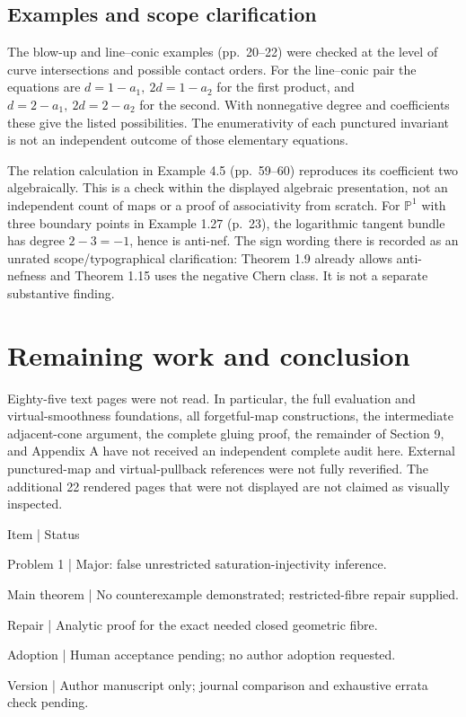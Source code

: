 \documentclass[10pt]{article}
\begin{document}
\subsection*{Examples and scope clarification}
The blow-up and line–conic examples (pp. 20–22) were checked at the level of curve intersections and possible contact orders. For the line–conic pair the equations are \(d=1-a_1,\ 2d=1-a_2\) for the first product, and \(d=2-a_1,\ 2d=2-a_2\) for the second. With nonnegative degree and coefficients these give the listed possibilities. The enumerativity of each punctured invariant is not an independent outcome of those elementary equations.\par
The relation calculation in Example 4.5 (pp. 59–60) reproduces its coefficient two algebraically. This is a check within the displayed algebraic presentation, not an independent count of maps or a proof of associativity from scratch. For \(\mathbb P^1\) with three boundary points in Example 1.27 (p. 23), the logarithmic tangent bundle has degree \(2-3=-1\), hence is anti-nef. The sign wording there is recorded as an unrated scope/typographical clarification: Theorem 1.9 already allows anti-nefness and Theorem 1.15 uses the negative Chern class. It is not a separate substantive finding.\par
\section*{Remaining work and conclusion}
Eighty-five text pages were not read. In particular, the full evaluation and virtual-smoothness foundations, all forgetful-map constructions, the intermediate adjacent-cone argument, the complete gluing proof, the remainder of Section 9, and Appendix A have not received an independent complete audit here. External punctured-map and virtual-pullback references were not fully reverified. The additional 22 rendered pages that were not displayed are not claimed as visually inspected.\par
Item | Status\par
Problem 1 | Major: false unrestricted saturation-injectivity inference.\par
Main theorem | No counterexample demonstrated; restricted-fibre repair supplied.\par
Repair | Analytic proof for the exact needed closed geometric fibre.\par
Adoption | Human acceptance pending; no author adoption requested.\par
Version | Author manuscript only; journal comparison and exhaustive errata check pending.\par
\end{document}
